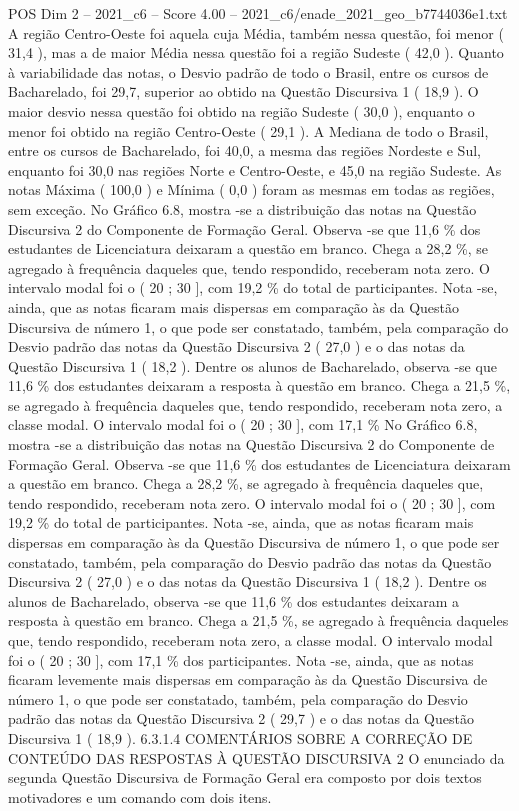 \begin{textsample}{POS Dim 2 – 2021\_c6 – Score 4.00 – 2021\_c6/enade\_2021\_geo\_b7744036e1.txt}
A região Centro-Oeste foi aquela cuja Média, também nessa questão, foi menor ( 31,4 ), mas a de maior Média nessa questão foi a região Sudeste ( 42,0 ).
Quanto à variabilidade das notas, o Desvio padrão de todo o Brasil, entre os cursos de Bacharelado, foi 29,7, superior ao obtido na Questão Discursiva 1 ( 18,9 ).
O maior desvio nessa questão foi obtido na região Sudeste ( 30,0 ), enquanto o menor foi obtido na região Centro-Oeste ( 29,1 ).
A Mediana de todo o Brasil, entre os cursos de Bacharelado, foi 40,0, a mesma das regiões Nordeste e Sul, enquanto foi 30,0 nas regiões Norte e Centro-Oeste, e 45,0 na região Sudeste.
As notas Máxima ( 100,0 ) e Mínima ( 0,0 ) foram as mesmas em todas as regiões, sem exceção.
No Gráfico 6.8, mostra -se a distribuição das notas na Questão Discursiva 2 do Componente de Formação Geral.
Observa -se que 11,6 \% dos estudantes de Licenciatura deixaram a questão em branco.
Chega a 28,2 \%, se agregado à frequência daqueles que, tendo respondido, receberam nota zero.
O intervalo modal foi o ( 20 ; 30 ], com 19,2 \% do total de participantes.
Nota -se, ainda, que as notas ficaram mais dispersas em comparação às da Questão Discursiva de número 1, o que pode ser constatado, também, pela comparação do Desvio padrão das notas da Questão Discursiva 2 ( 27,0 ) e o das notas da Questão Discursiva 1 ( 18,2 ).
Dentre os alunos de Bacharelado, observa -se que 11,6 \% dos estudantes deixaram a resposta à questão em branco.
Chega a 21,5 \%, se agregado à frequência daqueles que, tendo respondido, receberam nota zero, a classe modal.
O intervalo modal foi o ( 20 ; 30 ], com 17,1 \% No Gráfico 6.8, mostra -se a distribuição das notas na Questão Discursiva 2 do Componente de Formação Geral.
Observa -se que 11,6 \% dos estudantes de Licenciatura deixaram a questão em branco.
Chega a 28,2 \%, se agregado à frequência daqueles que, tendo respondido, receberam nota zero.
O intervalo modal foi o ( 20 ; 30 ], com 19,2 \% do total de participantes.
Nota -se, ainda, que as notas ficaram mais dispersas em comparação às da Questão Discursiva de número 1, o que pode ser constatado, também, pela comparação do Desvio padrão das notas da Questão Discursiva 2 ( 27,0 ) e o das notas da Questão Discursiva 1 ( 18,2 ).
Dentre os alunos de Bacharelado, observa -se que 11,6 \% dos estudantes deixaram a resposta à questão em branco.
Chega a 21,5 \%, se agregado à frequência daqueles que, tendo respondido, receberam nota zero, a classe modal.
O intervalo modal foi o ( 20 ; 30 ], com 17,1 \% dos participantes.
Nota -se, ainda, que as notas ficaram levemente mais dispersas em comparação às da Questão Discursiva de número 1, o que pode ser constatado, também, pela comparação do Desvio padrão das notas da Questão Discursiva 2 ( 29,7 ) e o das notas da Questão Discursiva 1 ( 18,9 ). 6.3.1.4 COMENTÁRIOS SOBRE A CORREÇÃO DE CONTEÚDO DAS RESPOSTAS À QUESTÃO DISCURSIVA 2 O enunciado da segunda Questão Discursiva de Formação Geral era composto por dois textos motivadores e um comando com dois itens.

\end{textsample}
